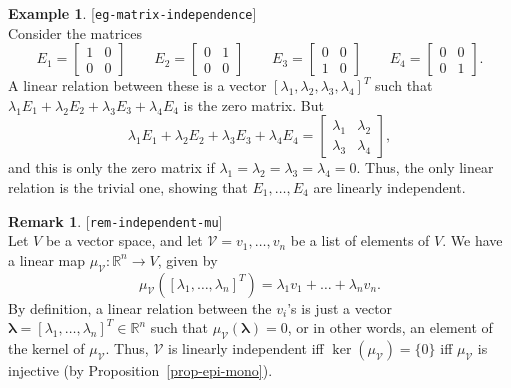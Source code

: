 \documentclass{amsart}
\newcommand{\lbl}[1]{\label{#1}\textup{[\texttt{#1}]}\ \\}
\newcommand{\lbl}{\label}
\newcommand{\R}         {{\mathbb{R}}}
\newcommand{\bsm}       {\left[\begin{smallmatrix}}
\newcommand{\esm}       {\end{smallmatrix}\right]}
\newcommand{\lm}        {\lambda}
\newcommand{\xra}       {\xrightarrow}
\newcommand{\vlm}       {\mathbf{\lambda}}
\newcommand{\CV}        {{\mathcal{V}}}
\renewcommand{\:}       {\colon}
\theoremstyle{definition}
\newtheorem{remark}[theorem]{Remark}
\newtheorem{example}[theorem]{Example}
\begin{document}
\begin{example}\lbl{eg-matrix-independence}
  Consider the matrices
  \[ E_1 = \bsm 1&0\\0&0 \esm \hspace{2em}
     E_2 = \bsm 0&1\\0&0 \esm \hspace{2em}
     E_3 = \bsm 0&0\\1&0 \esm \hspace{2em}
     E_4 = \bsm 0&0\\0&1 \esm.
  \]
  A linear relation between these is a vector
  $[\lm_1,\lm_2,\lm_3,\lm_4]^T$ such that
  $\lm_1E_1+\lm_2E_2+\lm_3E_3+\lm_4E_4$ is the
  zero matrix.  But
  \[ \lm_1E_1+\lm_2E_2+\lm_3E_3+\lm_4E_4 =
       \bsm \lm_1 & \lm_2 \\ \lm_3 & \lm_4 \esm,
  \]
  and this is only the zero matrix if
  $\lm_1=\lm_2=\lm_3=\lm_4=0$.  Thus, the only linear
  relation is the trivial one, showing that $E_1,\dotsc,E_4$
  are linearly independent.
\end{example}

\begin{remark}\lbl{rem-independent-mu}
 Let $V$ be a vector space, and let $\CV=v_1,\ldots,v_n$ be
 a list of elements of $V$.  We have a linear map
 $\mu_{\CV}\:\R^n\xra{}V$, given by
 \[ \mu_{\CV}([\lm_1,\ldots,\lm_n]^T) =
 \lm_1v_1+\ldots+\lm_nv_n. \] By definition, a linear
 relation between the $v_i$'s is just a vector
 $\vlm=[\lm_1,\ldots,\lm_n]^T\in\R^n$ such that
 $\mu_{\CV}(\vlm)=0$, or in other words, an element
 of the kernel of $\mu_{\CV}$.  Thus, $\CV$ is linearly
 independent iff $\ker(\mu_{\CV})=\{0\}$ iff $\mu_{\CV}$ is
 injective (by Proposition~\ref{prop-epi-mono}).
\end{remark}
\end{document}
